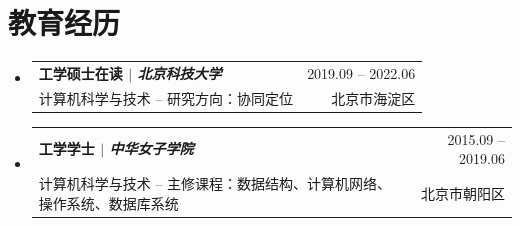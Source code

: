 \documentclass[a4paper,11pt]{ctexart}
\makeatletter
\newcommand{\CVSubheading}[4]{
	\vspace{-2pt}\item
	\begin{tabular*}{0.97\textwidth}[t]{l@{\extracolsep{\fill}}r}
		\textbf{#1} & #2 \\
		\small#3 & \small #4 \\
	\end{tabular*}\vspace{-7pt}
}
\newcommand{\CVSubHeadingListStart}{\begin{itemize}[leftmargin=0.5cm, label={}]}
\newcommand{\CVSubHeadingListEnd}{\end{itemize}}
\makeatother
\begin{document}
	
	

	
	\section{教育经历}
	\CVSubHeadingListStart
	\CVSubheading
	{{工学硕士在读 $|$ \emph{\small{北京科技大学}}}}{2019.09 -- 2022.06}
	{计算机科学与技术 -- 研究方向：协同定位}{北京市海淀区}
	\CVSubheading
	{{工学学士 $|$ \emph{\small{中华女子学院}}}}{2015.09 -- 2019.06}
	{计算机科学与技术 -- 主修课程：数据结构、计算机网络、操作系统、数据库系统}{北京市朝阳区}
	\CVSubHeadingListEnd
	

	
\end{document}
